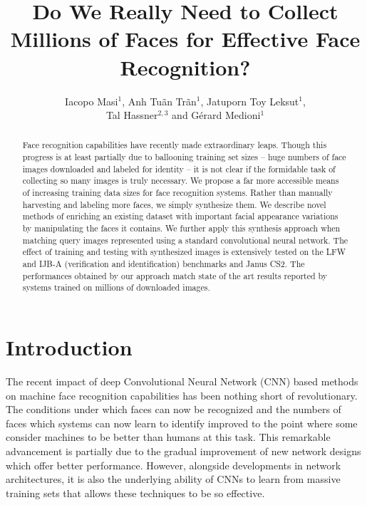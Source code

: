 \documentclass[runningheads]{llncs}
\begin{document}
\pagestyle{headings}
\mainmatter

\title{Do We Really Need to Collect Millions of Faces for Effective Face Recognition?} 

\author{Iacopo Masi$^1$, Anh Tu\~{a}n Tr\~{a}n$^1$, Jatuporn Toy Leksut$^1$,\\Tal Hassner$^{2,3}$ and G\'{e}rard Medioni$^1$}



\maketitle

\begin{abstract}
Face recognition capabilities have recently made extraordinary leaps. Though this progress is at least partially due to ballooning training set sizes -- huge numbers of face images downloaded and labeled for identity -- it is not clear if the formidable task of collecting so many images is truly necessary. We propose a far more accessible means of increasing training data sizes for face recognition systems. Rather than manually harvesting and labeling more faces, we simply synthesize them. We describe novel methods of enriching an existing dataset with important facial appearance variations by manipulating the faces it contains. We further apply this synthesis approach when matching query images represented using a standard convolutional neural network. The effect of training and testing with synthesized images is extensively tested on the LFW and IJB-A (verification and identification) benchmarks and Janus CS2. The performances obtained by our approach match state of the art results reported by systems trained on millions of downloaded images. 
\end{abstract}
 

\section{Introduction}\label{sec:intro}
The recent impact of deep Convolutional Neural Network (CNN) based methods on machine face recognition capabilities has been nothing short of revolutionary. The conditions under which faces can now be recognized and the numbers of faces which systems can now learn to identify improved to the point where some consider machines to be better than humans at this task. This remarkable advancement is partially due to the gradual improvement of new network designs which offer better performance. However, alongside developments in network architectures, it is also the underlying ability of CNNs to learn from massive training sets that allows these techniques to be so effective. 
\end{document}
